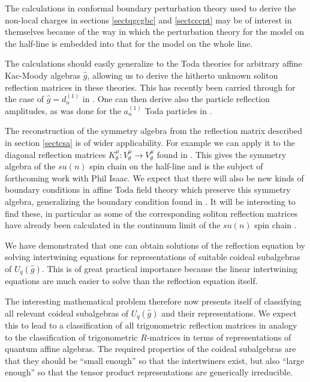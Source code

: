 \documentclass[a4paper,12pt]{article}
\newcommand{\uqgh}{U_q(\hat{g})}
\numberwithin{equation}{section}
\begin{document}
The calculations in conformal boundary perturbation theory used to
derive the non-local charges in sections \ref{sectqgcgbc} and
\ref{sectcccpt} may be of interest in themselves because of the
way in which the perturbation theory for the model on the
half-line is embedded into that for the model on the whole line.

The calculations should easily generalize to the Toda theories for
arbitrary affine Kac-Moody algebras $\hat{g}$, allowing us to
derive the hitherto unknown soliton reflection matrices in these
theories. This has recently been carried through for the case of
$\hat{g}=d_n^{(1)}$ in \cite{A}. One can then derive also the
particle reflection amplitudes, as was done for the $a_n^{(1)}$
Toda particles in \cite{Del99}.

The reconstruction of the symmetry algebra from the reflection
matrix described in section \ref{sectcsa} is of wider
applicability. For example we can apply it to the diagonal
reflection matrices $K^\mu_\theta:V^\mu_\theta\rightarrow
V^\mu_\theta$ found in \cite{dev93}. This gives the symmetry
algebra of the $su(n)$ spin chain on the half-line and is the
subject of forthcoming work with Phil Isaac. We expect that there
will also be new kinds of boundary conditions in affine Toda field
theory which preserve this symmetry algebra, generalizing the
boundary condition found in \cite{Del98b}. It will be interesting
to find these, in particular as some of the corresponding soliton
reflection matrices have already been calculated in the continuum
limit of the $su(n)$ spin chain \cite{Doi99}.

We have demonstrated that one can obtain solutions of the
reflection equation by solving intertwining equations for
representations of suitable coideal subalgebras of $\uqgh$. This
is of great practical importance because the linear intertwining
equations are much easier to solve than the reflection equation
itself.

The interesting mathematical problem therefore now presents itself
of classifying all relevant coideal subalgebras of $\uqgh$ and
their representations. We expect this to lead to a classification
of all trigonometric reflection matrices in analogy to the
classification of trigonometric $R$-matrices in terms of
representations of quantum affine algebras. The required
properties of the coideal subalgebras are that they should be
``small enough'' so that the intertwiners exist, but also ``large
enough'' so that the tensor product representations are
generically irreducible.
\end{document}
